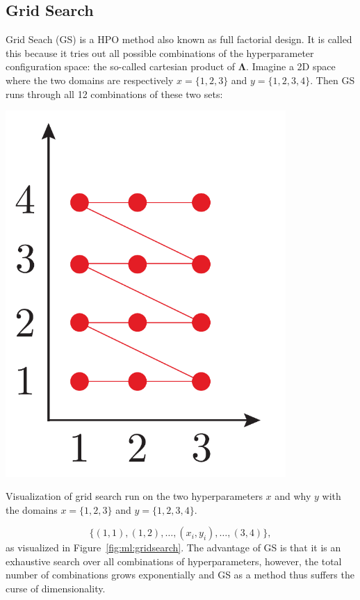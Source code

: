 \documentclass[a4paper, twoside, nobib]{tufte-book}
\begin{document}
\subsection{Grid Search}
\label{subsec:ml:grid_search}

Grid Seach (GS) is a HPO method also known as full factorial design. It is called this because it tries out all possible combinations of the hyperparameter configuration space: the so-called cartesian product of $\bm{\Lambda}$. Imagine a 2D space where the two domains are respectively $x=\{1, 2, 3\}$ and $y=\{1, 2, 3,4\}$. Then GS runs through all \num{12} combinations of these two sets: 

\begin{marginfigure}
  \includegraphics[width=0.8\textwidth]{figures/gridsearch/grid.pdf}
  \caption[Grid Search]{Visualization of grid search run on the two hyperparameters $x$ and why $y$ with the domains $x=\{1, 2, 3\}$ and $y=\{1, 2, 3,4\}$.}
  \label{fig:ml:gridsearch}
\end{marginfigure}

\begin{equation}
  \{(1, 1), (1, 2), \dots, (x_i, y_i), \dots, (3, 4)\},
\end{equation}
as visualized in Figure~\ref{fig:ml:gridsearch}. The advantage of GS is that it is an exhaustive search over all combinations of hyperparameters, however, the total number of combinations grows exponentially and GS as a method thus suffers the curse of dimensionality.
\end{document}
